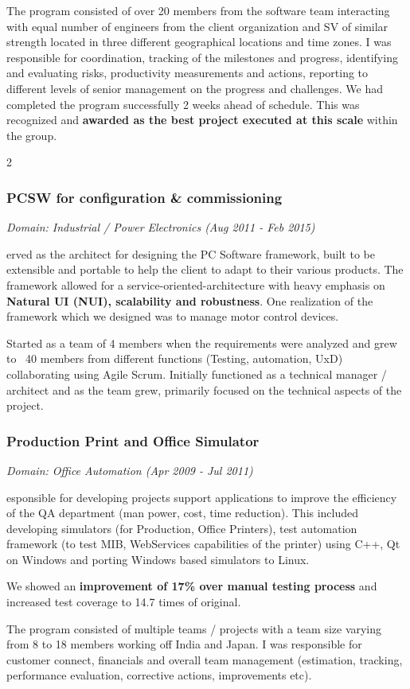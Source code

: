 \documentclass[a4paper,11pt]{article}
\newcommand\cvprojectentry[5]{
  \subsubsection*{#1}
  
  \vspace{-7pt}
  
  \it{Domain: #2}\normalfont{} \quad (#3 - #4)
  
}
\begin{document}
The program consisted of over 20 members from the software team
interacting with equal number of engineers from the client
organization and SV of similar strength located in three different
geographical locations and time zones. I was responsible for
coordination, tracking of the milestones and progress, identifying and
evaluating risks, productivity measurements and actions, reporting to
different levels of senior management on the progress and challenges. We
had completed the program successfully 2 weeks ahead of schedule. This
was recognized and \textbf{awarded as the best project executed at this
scale} within the group.

\begin{multicols}{2}

\cvprojectentry{PCSW for configuration \& commissioning}{Industrial / Power Electronics}{Aug 2011}{Feb 2015}

Served as the architect for designing the PC Software framework, built
to be extensible and portable to help the client to adapt to their
various products. The framework allowed for a
service-oriented-architecture with heavy emphasis on \textbf{Natural
  UI (NUI), scalability and robustness}. One realization of the
framework which we designed was to manage motor control devices.
 
Started as a team of 4 members when the requirements were analyzed and
grew to ~40 members from different functions (Testing, automation,
UxD) collaborating using Agile Scrum. Initially functioned as a
technical manager / architect and as the team grew, primarily focused
on the technical aspects of the project.

\cvprojectentry{Production Print and Office Simulator}{Office Automation}{Apr 2009}{Jul 2011}
 
Responsible for developing projects support applications to improve
the efficiency of the QA department (man power, cost, time
reduction). This included developing simulators (for Production,
Office Printers), test automation framework (to test MIB, WebServices
capabilities of the printer) using C++, Qt on Windows and porting
Windows based simulators to Linux.
 
We showed an \textbf{improvement of 17\% over manual testing process} and
increased test coverage to 14.7 times of original.
 
The program consisted of multiple teams / projects with a team size varying from 8 to 18 members working off India and Japan. I was responsible for
customer connect, financials and overall team management (estimation,
tracking, performance evaluation, corrective actions, improvements
etc).
 

\end{multicols}
\end{document}
